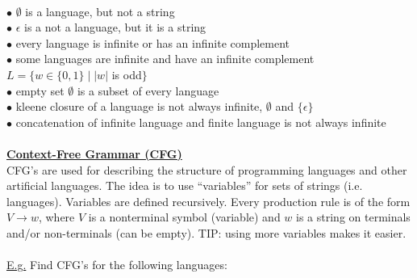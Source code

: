 \documentclass[8pt,letterpaper,twocolumn]{article}
\begin{document}
\\
$\bullet$ $\emptyset$ is a language, but not a string\\
$\bullet$ $\epsilon$ is a not a language, but it is a string\\
$\bullet$ every language is infinite or has an infinite complement\\
$\bullet$ some languages are infinite and have an infinite complement
$L = \{w \in \{0,1\} \mid |w|$ is odd$\}$\\
$\bullet$ empty set $\emptyset$ is a subset of every language\\
$\bullet$ kleene closure of a language is not always infinite, $\emptyset$ and $\{\epsilon\}$\\
$\bullet$ concatenation of infinite language and finite language is not always infinite\\
\\
\underline{\textbf{Context-Free Grammar (CFG)}} \\
CFG's are used for describing the structure of programming languages and other artificial languages.
The idea is to use ``variables'' for sets of strings (i.e. languages). Variables are defined
recursively. Every production rule is of the form $V \rightarrow w$, where $V$ is a nonterminal
symbol (variable) and $w$ is a string on terminals and/or non-terminals (can be empty).
TIP: using more variables makes it easier.
\\ \\
\underline{E.g.}
Find CFG's for the following languages:
\end{document}

